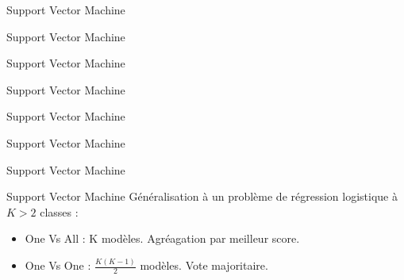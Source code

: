 \begin{frame}{Support Vector Machine}
\end{frame}

\begin{frame}{Support Vector Machine}
\end{frame}

\begin{frame}{Support Vector Machine}
\end{frame}

\begin{frame}{Support Vector Machine}
\end{frame}

\begin{frame}{Support Vector Machine}
\end{frame}

\begin{frame}{Support Vector Machine}
\end{frame}

\begin{frame}{Support Vector Machine}
\end{frame}

\begin{frame}{Support Vector Machine}
  Généralisation à un problème de régression logistique à $K>2$ classes :
  \begin{itemize}
  \item One Vs All : K modèles. Agréagation par meilleur score.
  \item One Vs One : $\frac{K(K-1)}{2}$ modèles. Vote majoritaire.
  \end{itemize}
\end{frame}
